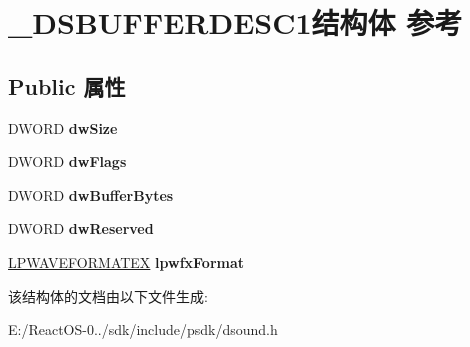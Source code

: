 \hypertarget{struct___d_s_b_u_f_f_e_r_d_e_s_c1}{}\section{\+\_\+\+D\+S\+B\+U\+F\+F\+E\+R\+D\+E\+S\+C1结构体 参考}
\label{struct___d_s_b_u_f_f_e_r_d_e_s_c1}
\subsection*{Public 属性}
\begin{DoxyCompactItemize}
\item 
\mbox{\label{struct___d_s_b_u_f_f_e_r_d_e_s_c1_ae59037d2c1d1c6a914f8df90381ccfcc}} 
D\+W\+O\+RD {\bfseries dw\+Size}
\item 
\mbox{\label{struct___d_s_b_u_f_f_e_r_d_e_s_c1_a5cae590221b91727212fdac40f3d06e0}} 
D\+W\+O\+RD {\bfseries dw\+Flags}
\item 
\mbox{\label{struct___d_s_b_u_f_f_e_r_d_e_s_c1_a1da3b865548c46fbe8e8533b257027d0}} 
D\+W\+O\+RD {\bfseries dw\+Buffer\+Bytes}
\item 
\mbox{\label{struct___d_s_b_u_f_f_e_r_d_e_s_c1_af310ac860852aeb409387fb4ef56bd3e}} 
D\+W\+O\+RD {\bfseries dw\+Reserved}
\item 
\mbox{\label{struct___d_s_b_u_f_f_e_r_d_e_s_c1_a1b20280d535e2df0200a2f156876efc6}} 
\hyperlink{struct___w_a_v_e_f_o_r_m_a_t_e_x}{L\+P\+W\+A\+V\+E\+F\+O\+R\+M\+A\+T\+EX} {\bfseries lpwfx\+Format}
\end{DoxyCompactItemize}


该结构体的文档由以下文件生成\+:\begin{DoxyCompactItemize}
\item 
E\+:/\+React\+O\+S-\/0../sdk/include/psdk/dsound.\+h\end{DoxyCompactItemize}
